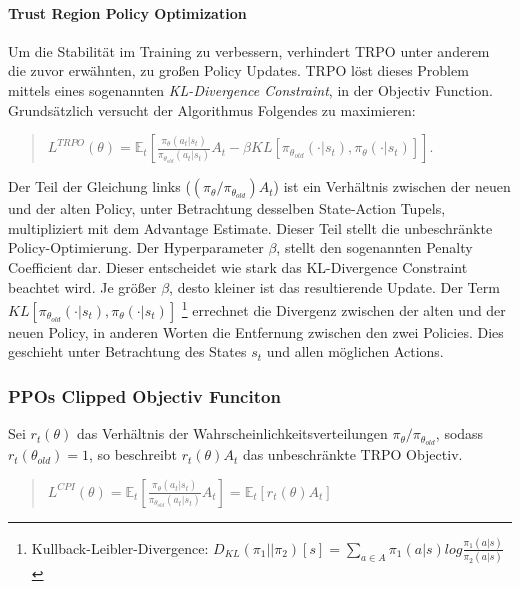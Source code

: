 \paragraph{Trust Region Policy Optimization}\label{par:absch_RL_PPO_hintergrund_TRPO}
Um die Stabilität im Training zu verbessern, verhindert TRPO unter anderem die zuvor erwähnten, zu großen Policy Updates. TRPO löst dieses Problem mittels eines sogenannten \emph{KL-Divergence Constraint}, in der Objectiv Function. Grundsätzlich versucht der Algorithmus Folgendes zu maximieren: 

\begin{quotation}
\centering
   \( L^{TRPO}(\theta) =  \mathbb{E}_t [ \frac{ \pi_{\theta}(a_t | s_t)}{ \pi_{\theta_{old}}(a_t | s_t) } A_t  -  \beta KL [ \pi_{\theta_{old}}( \cdot | s_t), \pi_{\theta}( \cdot | s_t ) ] ] \).
\end{quotation}

Der Teil der Gleichung links ($(\pi_{\theta} / \pi_{\theta_{old}}) A_t$) ist ein Verhältnis zwischen der neuen und der alten Policy, unter Betrachtung desselben State-Action Tupels, multipliziert mit dem Advantage Estimate. Dieser Teil stellt die unbeschränkte Policy-Optimierung. Der Hyperparameter $ \beta$, stellt den sogenannten Penalty Coefficient dar. Dieser entscheidet wie stark das KL-Divergence Constraint beachtet wird. Je größer $ \beta$, desto kleiner ist das resultierende Update. Der Term $ KL [ \pi_{\theta_{old}}( \cdot | s_t), \pi_{\theta}( \cdot | s_t ) ] $  \footnote{Kullback-Leibler-Divergence: $ D_{KL}(\pi_1 || \pi_2)[s] = \sum_{a \in A} \pi_1 (a|s) log \frac{\pi_1 (a|s)}{\pi_2 (a|s)} $} errechnet die Divergenz zwischen der alten und der neuen Policy, in anderen Worten die Entfernung zwischen den zwei Policies. Dies geschieht unter Betrachtung des States $s_t$ und allen möglichen Actions.

\subsubsection{PPOs Clipped Objectiv Funciton}\label{absch_RL_qFunc}
Sei $ r_t(\theta) $ das Verhältnis der Wahrscheinlichkeitsverteilungen $ \pi_{\theta} / \pi_{\theta_{old}} $, sodass $ r_t(\theta_{old}) = 1 $, so beschreibt $ r_t(\theta) A_t $ das unbeschränkte TRPO Objectiv. 

\begin{quotation}
\centering
   \( L^{CPI}(\theta) =  \mathbb{E}_t [ \frac{ \pi_{\theta} (a_t | s_t) }{ \pi_{\theta_{old}} (a_t | s_t) } A_t ] = \mathbb{E}_t [ r_t(\theta) A_t ] \)
\end{quotation}

